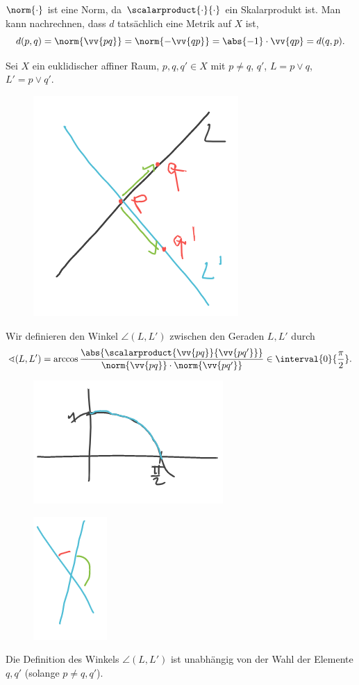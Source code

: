 \begin{bemerkung*}
  \( \norm{\cdot} \) ist eine Norm, da \( \scalarproduct{\cdot}{\cdot} \) ein Skalarprodukt ist. Man kann nachrechnen, dass \( d \) tatsächlich eine Metrik auf \( X \) ist, \zb
  \begin{equation*}
    d(p,q)=\norm{\vv{pq}}=\norm{-\vv{qp}}=\abs{-1}\cdot\vv{qp}=d(q,p).
  \end{equation*}
\end{bemerkung*}
\begin{definition*}
  Sei \( X \) ein euklidischer affiner Raum, \( p,q,q'\in X \) mit \( p\neq q \), \( q' \), \( L=p\vee q \), \( L'=p\vee q' \).
  \begin{figure}[H]
    \centering
    \includegraphics[width=0.5\linewidth]{figures/affiner_winkel_definition}
    \label{fig:affiner_winkel_definition}
  \end{figure}
  Wir definieren den Winkel \( \angle (L,L') \) zwischen den Geraden \( L,L' \) durch
  \begin{equation*}
    \angle (L,L')=\arccos \frac{\abs{\scalarproduct{\vv{pq}}{\vv{pq'}}}}{\norm{\vv{pq}}\cdot\norm{\vv{pq'}}}\in \interval{0}{\frac{\pi}{2}}.
  \end{equation*}
  \begin{figure}[H]
    \centering
    \includegraphics[width=0.3\linewidth]{figures/affiner_winkel_definition_wertebereich}
    \label{fig:affiner_winkel_definition_wertebereich}
  \end{figure}
  \begin{figure}[H]
    \centering
    \includegraphics[width=0.1\linewidth]{figures/affiner_winkel_definition_wertebereich_beispiel}
    \label{fig:affiner_winkel_definition_wertebereich_beispiel}
  \end{figure}
\end{definition*}
\begin{bemerkung*}
  Die Definition des Winkels \( \angle (L,L') \) ist unabhängig von der Wahl der Elemente \( q,q' \) (solange \( p\neq q,q' \)).
\end{bemerkung*}
